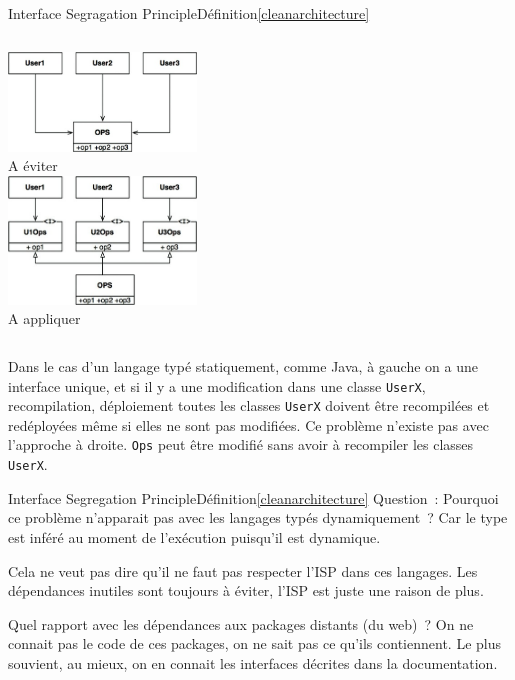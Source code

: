 \documentclass{beamer}
\begin{document}
    \begin{frame}{Interface Segragation Principle}{Définition\cref{cleanarchitecture}}
        \begin{columns}
            \centering
            \includegraphics[width=5cm]{image/i-to-avoid} \\ A éviter \\
            \centering
            \includegraphics[width=5cm]{image/i-preferred} \\ A appliquer \\
        \end{columns}
        Dans le cas d'un langage typé statiquement, comme Java, à gauche on a une interface unique, et si il y a une modification dans une classe \lstinline{UserX}, recompilation, déploiement toutes les classes \lstinline{UserX} doivent être recompilées et redéployées même si elles ne sont pas modifiées.
        \bigbreak
        Ce problème n'existe pas avec l'approche à droite. \lstinline{Ops} peut être modifié sans avoir à recompiler les classes \lstinline{UserX}.
    \end{frame}

    \begin{frame}{Interface Segregation Principle}{Définition\cref{cleanarchitecture}}
        Question~: Pourquoi ce problème n'apparait pas avec les langages typés dynamiquement~?
        \pause
        \bigbreak
        Car le type est inféré au moment de l'exécution puisqu'il est dynamique.
        \begin{dangercolorbox}
            Cela ne veut pas dire qu'il ne faut pas respecter l'ISP dans ces langages.
            Les dépendances inutiles sont toujours à éviter, l'ISP est juste une raison de plus.
        \end{dangercolorbox}
        Quel rapport avec les dépendances aux packages distants (du web)~?
        \pause
        \bigbreak
        On ne connait pas le code de ces packages, on ne sait pas ce qu'ils contiennent.
        Le plus souvient, au mieux, on en connait les interfaces décrites dans la documentation.
    \end{frame}
\end{document}
